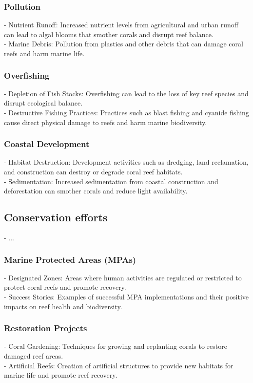 \subsubsection{Pollution}
- Nutrient Runoff: Increased nutrient levels from agricultural and urban runoff can lead to algal blooms that smother corals and disrupt reef balance. \\
- Marine Debris: Pollution from plastics and other debris that can damage coral reefs and harm marine life.
\subsubsection{Overfishing}
- Depletion of Fish Stocks: Overfishing can lead to the loss of key reef species and disrupt ecological balance. \\
- Destructive Fishing Practices: Practices such as blast fishing and cyanide fishing cause direct physical damage to reefs and harm marine biodiversity. 
\subsubsection{Coastal Development}
- Habitat Destruction: Development activities such as dredging, land reclamation, and construction can destroy or degrade coral reef habitats. \\
- Sedimentation: Increased sedimentation from coastal construction and deforestation can smother corals and reduce light availability.

\subsection{Conservation efforts}
- ... 
\subsubsection{Marine Protected Areas (MPAs)}
- Designated Zones: Areas where human activities are regulated or restricted to protect coral reefs and promote recovery. \\
- Success Stories: Examples of successful MPA implementations and their positive impacts on reef health and biodiversity.
\subsubsection{Restoration Projects}
- Coral Gardening: Techniques for growing and replanting corals to restore damaged reef areas. \\
- Artificial Reefs: Creation of artificial structures to provide new habitats for marine life and promote reef recovery.
